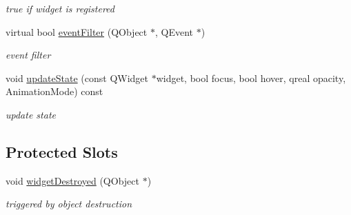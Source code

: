 \begin{DoxyCompactItemize}
\begin{DoxyCompactList}\small\item\em true if widget is registered \end{DoxyCompactList}\item 
\mbox{\label{class_frame_shadow_factory_a1d0c2bd55898279ec7a48b06aa34ffb2}} 
virtual bool \hyperlink{class_frame_shadow_factory_a1d0c2bd55898279ec7a48b06aa34ffb2}{event\+Filter} (Q\+Object $\ast$, Q\+Event $\ast$)
\begin{DoxyCompactList}\small\item\em event filter \end{DoxyCompactList}\item 
\mbox{\label{class_frame_shadow_factory_aa1b72c51e9c0d5980fa472b94af88789}} 
void \hyperlink{class_frame_shadow_factory_aa1b72c51e9c0d5980fa472b94af88789}{update\+State} (const Q\+Widget $\ast$widget, bool focus, bool hover, qreal opacity, Animation\+Mode) const
\begin{DoxyCompactList}\small\item\em update state \end{DoxyCompactList}\end{DoxyCompactItemize}
\subsection*{Protected Slots}
\begin{DoxyCompactItemize}
\item 
\mbox{\label{class_frame_shadow_factory_a6707952430ff1cb04008b079de5e5976}} 
void \hyperlink{class_frame_shadow_factory_a6707952430ff1cb04008b079de5e5976}{widget\+Destroyed} (Q\+Object $\ast$)
\begin{DoxyCompactList}\small\item\em triggered by object destruction \end{DoxyCompactList}\end{DoxyCompactItemize}
